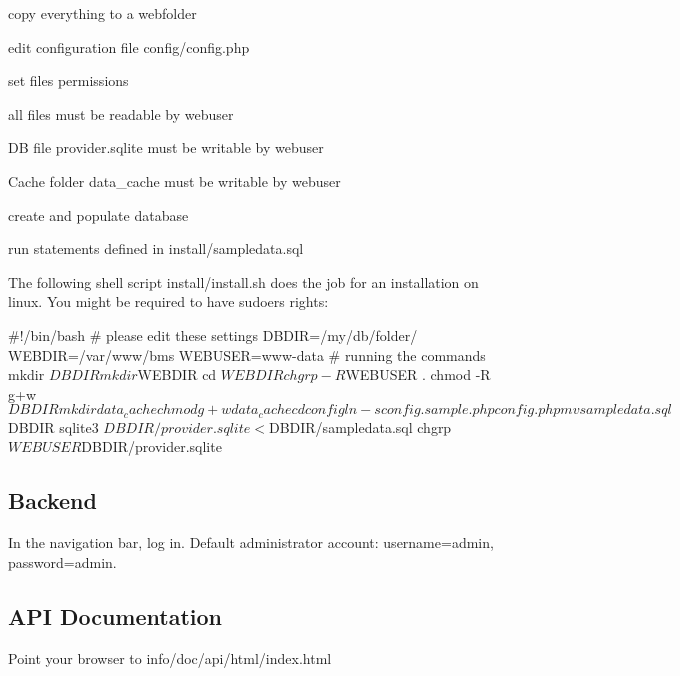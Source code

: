 \begin{DoxyEnumerate}
\item copy everything to a webfolder
\item edit configuration file {\ttfamily config/config.\+php}
\item set files permissions
\begin{DoxyItemize}
\item all files must be readable by webuser
\item DB file {\ttfamily provider.\+sqlite} must be writable by webuser
\item Cache folder {\ttfamily data\+\_\+cache} must be writable by webuser
\end{DoxyItemize}
\item create and populate database
\begin{DoxyItemize}
\item run statements defined in {\ttfamily install/sampledata.\+sql}
\end{DoxyItemize}
\end{DoxyEnumerate}

The following shell script {\ttfamily install/install.\+sh} does the job for an installation on linux. You might be required to have sudoer\textquotesingle{}s rights\+: \begin{DoxyVerb}#!/bin/bash
# please edit these settings
DBDIR=/my/db/folder/ 
WEBDIR=/var/www/bms 
WEBUSER=www-data  
# running the commands
mkdir $DBDIR  
mkdir $WEBDIR  
cd $WEBDIR  
chgrp -R $WEBUSER .  
chmod -R g+w $DBDIR   
mkdir data_cache  
chmod g+w data_cache 
cd config
ln -s config.sample.php config.php
mv sampledata.sql $DBDIR  
sqlite3 $DBDIR/provider.sqlite < $DBDIR/sampledata.sql
chgrp $WEBUSER $DBDIR/provider.sqlite
\end{DoxyVerb}


\subsection*{Backend}

In the navigation bar, log in. Default administrator account\+: {\ttfamily username=admin}, {\ttfamily password=admin}.

\subsection*{A\+PI Documentation}

Point your browser to {\ttfamily info/doc/api/html/index.\+html}

